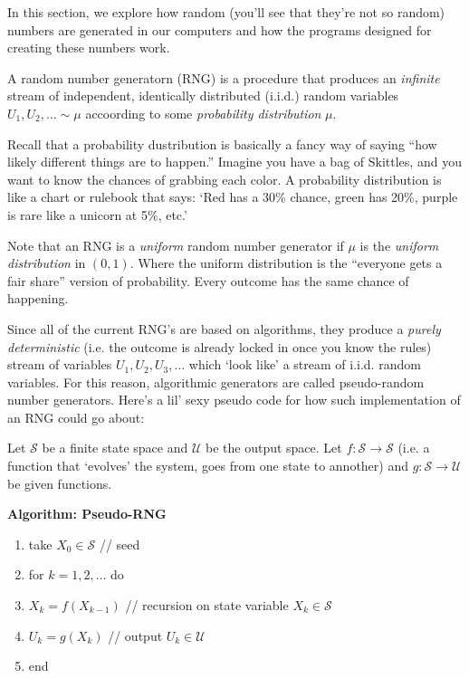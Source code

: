 In this section, we explore how random (you'll see that they're not so random) numbers are generated in our computers and how the programs designed for creating these numbers work.

\begin{definition}
    A random number generatorn (RNG) is a procedure that produces an \textit{infinite} stream of independent, identically distributed (i.i.d.) random variables $U_1, U_2, \ldots \sim \mu$
    accoording to some \textit{probability distribution} $\mu$.
\end{definition}

Recall that a probability dustribution is basically a fancy way of saying “how likely different things are to happen.” Imagine you have a bag of Skittles, and you want to know the chances of grabbing each color. 
A probability distribution is like a chart or rulebook that says: `Red has a 30\% chance, green has 20\%, purple is rare like a unicorn at 5\%, etc.'

\begin{remark}
    Note that an RNG is a \textit{uniform} random number generator if $\mu$ is the \textit{uniform distribution} in $(0,1)$. Where the uniform distribution is the “everyone gets a fair share” version of probability. Every outcome has the same chance of happening.
\end{remark}

Since all of the current RNG's are based on algorithms, they produce a \textit{purely deterministic} (i.e. the outcome is already locked in once you know the rules) stream of variables $U_1, U_2, U_3, \ldots$ which `look like' a stream of i.i.d. random variables. 
For this reason, algorithmic generators are called pseudo-random number generators. Here's a lil' sexy pseudo code for how such implementation of an RNG could go about:
\vspace{0.2cm}

Let $\mathcal{S}$ be a finite state space and $\mathcal{U}$ be the output space. Let $f: \mathcal{S} \to \mathcal{S}$ (i.e. a function that `evolves' the system, goes from one state to annother) and $g: \mathcal{S} \to \mathcal{U}$ be given functions.

\vspace{0.2cm}

\textbf{Algorithm: Pseudo-RNG}
\begin{enumerate}
    \item take $X_0 \in \mathcal{S}$ \quad // seed
    \item for $k=1, 2, \dots$ do
    \item $X_k = f(X_{k-1})$ // recursion on state variable $X_k \in \mathcal{S}$
    \item $U_k = g(X_k)$ // output $U_k \in \mathcal{U}$
    \item end
\end{enumerate}

